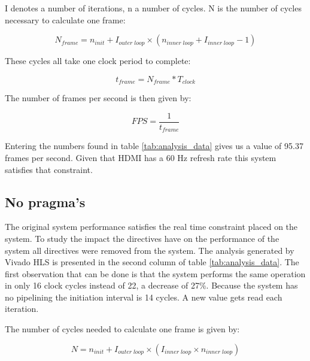 I denotes a number of iterations, n a number of cycles. N is the number of cycles necessary to calculate one frame:

\begin{equation}
N_{frame} = n_{init} + I_{outer\;loop} \times ( n_{inner\;loop} + I_{inner\;loop} - 1 )
\end{equation}



These cycles all take one clock period to complete:

\begin{equation}\label{eq:frametime}
t_{frame} = N_{frame} * T_{clock}
\end{equation}

The number of frames per second is then given by:

\begin{equation}\label{eq:fps}
FPS = \frac{1}{t_{frame}}
\end{equation}

Entering the numbers found in table \ref{tab:analysis_data} gives us a value of 95.37 frames per second. Given that HDMI has a 60 Hz refresh rate this system satisfies that constraint.


\subsection{No pragma's}
\label{sec:nopragma}

The original system performance satisfies the real time constraint placed on the system. To study the impact the directives have on the performance of the system all directives were removed from the  system. The analysis generated by Vivado HLS is presented in the second column of table \ref{tab:analysis_data}. The first observation that can be done is that the system performs the same operation in only 16 clock cycles instead of 22, a decrease of 27\%. Because the system has no pipelining the initiation interval is 14 cycles. A new value gets read each iteration.

The number of cycles needed to calculate one frame is given by:

\begin{equation}
N = n_{init} + I_{outer\;loop} \times (I_{inner\;loop} \times n_{inner\;loop})
\end{equation}



